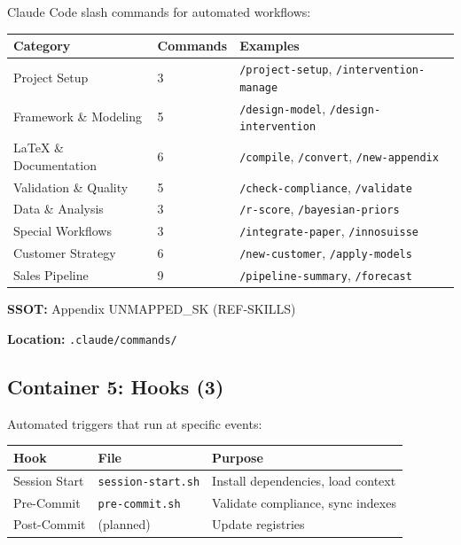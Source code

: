 Claude Code slash commands for automated workflows:

\begin{center}
\begin{tabular}{|l|l|l|}
\hline
\textbf{Category} & \textbf{Commands} & \textbf{Examples} \\
\hline
Project Setup & 3 & \texttt{/project-setup}, \texttt{/intervention-manage} \\
Framework \& Modeling & 5 & \texttt{/design-model}, \texttt{/design-intervention} \\
LaTeX \& Documentation & 6 & \texttt{/compile}, \texttt{/convert}, \texttt{/new-appendix} \\
Validation \& Quality & 5 & \texttt{/check-compliance}, \texttt{/validate} \\
Data \& Analysis & 3 & \texttt{/r-score}, \texttt{/bayesian-priors} \\
Special Workflows & 3 & \texttt{/integrate-paper}, \texttt{/innosuisse} \\
Customer Strategy & 6 & \texttt{/new-customer}, \texttt{/apply-models} \\
Sales Pipeline & 9 & \texttt{/pipeline-summary}, \texttt{/forecast} \\
\hline
\end{tabular}
\end{center}

\textbf{SSOT:} Appendix UNMAPPED_SK (REF-SKILLS)

\textbf{Location:} \texttt{.claude/commands/}


\subsection{Container 5: Hooks (3)}
\label{sec:bo-hooks}

Automated triggers that run at specific events:

\begin{center}
\begin{tabular}{|l|l|l|}
\hline
\textbf{Hook} & \textbf{File} & \textbf{Purpose} \\
\hline
Session Start & \texttt{session-start.sh} & Install dependencies, load context \\
Pre-Commit & \texttt{pre-commit.sh} & Validate compliance, sync indexes \\
Post-Commit & (planned) & Update registries \\
\hline
\end{tabular}
\end{center}

